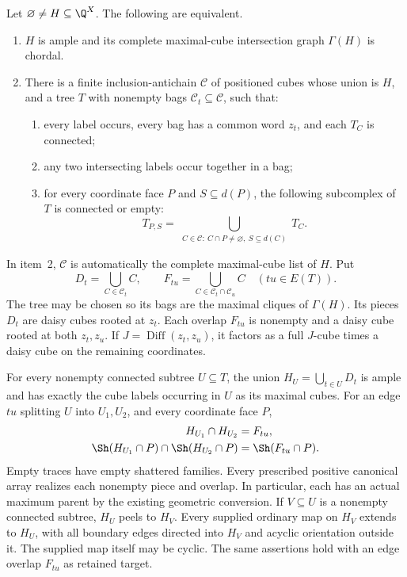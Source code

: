 \begin{theorem}
\label{thm:maxmin-chordal-downset-tree}
Let $\varnothing\ne H\subseteq\Q^X$. The following are equivalent.
\begin{enumerate}
\item $H$ is ample and its complete maximal-cube intersection graph
      $\Gamma(H)$ is chordal.
\item There is a finite inclusion-antichain $\mathcal C$ of positioned cubes
      whose union is $H$, and a tree $T$ with nonempty bags
      $\mathcal C_t\subseteq\mathcal C$, such that:
      \begin{enumerate}
      \item every label occurs, every bag has a common word $z_t$, and
            each $T_C$ is connected;
      \item any two intersecting labels occur together in a bag;
      \item for every coordinate face $P$ and $S\subseteq d(P)$,
            the following subcomplex of $T$ is connected or empty:
            \[
             T_{P,S}=\bigcup_{\substack{C\in\mathcal C:\
                    C\cap P\ne\varnothing,\ S\subseteq d(C)}}T_C.
            \]
      \end{enumerate}
\end{enumerate}
In item~2, $\mathcal C$ is automatically the complete maximal-cube list
of $H$. Put
\[
 D_t=\bigcup_{C\in\mathcal C_t}C,\qquad
 F_{tu}=\bigcup_{C\in\mathcal C_t\cap\mathcal C_u}C\quad(tu\in E(T)).
\]
The tree may be chosen so its bags are the maximal cliques of $\Gamma(H)$.
Its pieces $D_t$ are daisy cubes rooted at $z_t$.
Each overlap $F_{tu}$ is nonempty and a daisy cube rooted at both
$z_t,z_u$. If $J=\operatorname{Diff}(z_t,z_u)$, it factors as a full
$J$-cube times a daisy cube on the remaining coordinates.

For every nonempty connected subtree $U\subseteq T$, the union
$H_U=\bigcup_{t\in U}D_t$ is ample and has exactly the cube labels occurring
in $U$ as its maximal cubes. For an edge $tu$ splitting $U$ into $U_1,U_2$,
and every coordinate face $P$,
\begin{align}
 H_{U_1}\cap H_{U_2}&=F_{tu},\label{eq:maxmin-tree-exact-overlap}\\
 \Sh(H_{U_1}\cap P)\cap\Sh(H_{U_2}\cap P)
     &=\Sh(F_{tu}\cap P).
 \label{eq:maxmin-tree-positioned-shadows}
\end{align}
Empty traces have empty shattered families. Every prescribed positive
canonical array realizes each nonempty piece and overlap. In particular,
each has an actual maximum parent by the existing geometric conversion.
If $V\subseteq U$ is a nonempty connected subtree, $H_U$ peels to $H_V$.
Every supplied ordinary map on $H_V$ extends to $H_U$, with all boundary
edges directed into $H_V$ and acyclic orientation outside it. The supplied
map itself may be cyclic. The same assertions hold with an edge overlap
$F_{tu}$ as retained target.
\end{theorem}

